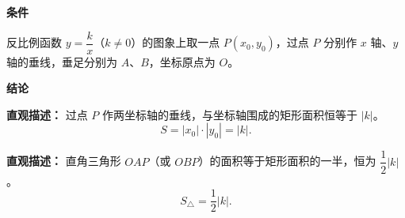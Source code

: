 \begin{statementbox}
	\textbf{\textcolor{CStatement}{条件}}
	\begin{description}[style=nextline, leftmargin=2.8em, labelsep=0.5em, itemsep=0.35em]
		\item[\textbf{\textcolor{CStatement}{条件 1（图象任一点）：}}]
		      反比例函数 $y=\dfrac{k}{x}$（$k\neq 0$）的图象上取一点 $P(x_0,y_0)$，过点 $P$ 分别作 $x$ 轴、$y$ 轴的垂线，垂足分别为 $A$、$B$，坐标原点为 $O$。
	\end{description}

	\textbf{\textcolor{CStatement}{结论}}
	\begin{description}[style=nextline, leftmargin=2.8em, labelsep=0.5em, itemsep=0.45em]
		\item[\textbf{\textcolor{CStatement}{结论一（矩形面积定值）：}}]
		      \textbf{\textcolor{CStatement}{直观描述：}}
		      过点 $P$ 作两坐标轴的垂线，与坐标轴围成的矩形面积恒等于 $|k|$。
		      \[
			      S=|x_0|\cdot |y_0|=|k|.
		      \]

		\item[\textbf{\textcolor{CStatement}{推广结论（直角三角形面积）：}}]
		      \textbf{\textcolor{CStatement}{直观描述：}}
		      直角三角形 $OAP$（或 $OBP$）的面积等于矩形面积的一半，恒为 $\dfrac{1}{2}|k|$。
		      \[
			      S_{\triangle}=\frac{1}{2}|k|.
		      \]
	\end{description}
\end{statementbox}
